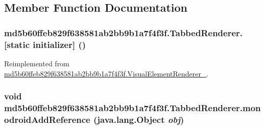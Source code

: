 \subsection{Member Function Documentation}
\hypertarget{classmd5b60ffeb829f638581ab2bb9b1a7f4f3f_1_1_tabbed_renderer_78c75b6f8cd7f1a32fa26866647bb950}{
\subsubsection[{[static initializer]}]{\setlength{\rightskip}{0pt plus 5cm}md5b60ffeb829f638581ab2bb9b1a7f4f3f.TabbedRenderer.\mbox{[}static initializer\mbox{]} ()}}
\label{classmd5b60ffeb829f638581ab2bb9b1a7f4f3f_1_1_tabbed_renderer_78c75b6f8cd7f1a32fa26866647bb950}




Reimplemented from \hyperlink{classmd5b60ffeb829f638581ab2bb9b1a7f4f3f_1_1_visual_element_renderer__1_3ae26bd8575212fb6d6f14487b4f48d4}{md5b60ffeb829f638581ab2bb9b1a7f4f3f.VisualElementRenderer\_}.\hypertarget{classmd5b60ffeb829f638581ab2bb9b1a7f4f3f_1_1_tabbed_renderer_1ac0d0bc3f7d31327bd95fbf0ddf533c}{
\subsubsection[{monodroidAddReference}]{\setlength{\rightskip}{0pt plus 5cm}void md5b60ffeb829f638581ab2bb9b1a7f4f3f.TabbedRenderer.monodroidAddReference (java.lang.Object {\em obj})}}
\label{classmd5b60ffeb829f638581ab2bb9b1a7f4f3f_1_1_tabbed_renderer_1ac0d0bc3f7d31327bd95fbf0ddf533c}




